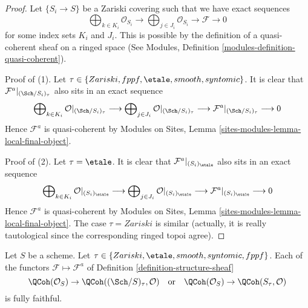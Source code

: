 \begin{proof}
Let $\{S_i \to S\}$ be a Zariski covering such that we have exact sequences
$$
\bigoplus\nolimits_{k \in K_i} \mathcal{O}_{S_i} \longrightarrow
\bigoplus\nolimits_{j \in J_i} \mathcal{O}_{S_i} \longrightarrow
\mathcal{F} \longrightarrow 0
$$
for some index sets $K_i$ and $J_i$. This is possible by the definition
of a quasi-coherent sheaf on a ringed space
(See Modules, Definition \ref{modules-definition-quasi-coherent}).

\medskip\noindent
Proof of (1). Let $\tau \in \{Zariski, \linebreak[0] fppf, \linebreak[0]
\etale, \linebreak[0] smooth, \linebreak[0] syntomic\}$.
It is clear that $\mathcal{F}^a|_{(\Sch/S_i)_\tau}$ also
sits in an exact sequence
$$
\bigoplus\nolimits_{k \in K_i} \mathcal{O}|_{(\Sch/S_i)_\tau}
\longrightarrow
\bigoplus\nolimits_{j \in J_i} \mathcal{O}|_{(\Sch/S_i)_\tau}
\longrightarrow
\mathcal{F}^a|_{(\Sch/S_i)_\tau} \longrightarrow 0
$$
Hence $\mathcal{F}^a$ is quasi-coherent by Modules on Sites,
Lemma \ref{sites-modules-lemma-local-final-object}.

\medskip\noindent
Proof of (2). Let $\tau = \etale$.
It is clear that $\mathcal{F}^a|_{(S_i)_\etale}$ also sits
in an exact sequence
$$
\bigoplus\nolimits_{k \in K_i} \mathcal{O}|_{(S_i)_\etale}
\longrightarrow
\bigoplus\nolimits_{j \in J_i} \mathcal{O}|_{(S_i)_\etale}
\longrightarrow
\mathcal{F}^a|_{(S_i)_\etale} \longrightarrow 0
$$
Hence $\mathcal{F}^a$ is quasi-coherent by Modules on Sites,
Lemma \ref{sites-modules-lemma-local-final-object}.
The case $\tau = Zariski$ is similar (actually, it is really
tautological since the corresponding ringed topoi agree).
\end{proof}

\begin{lemma}
\label{lemma-fully-faithful-associated}
Let $S$ be a scheme.
Let $\tau \in \{Zariski, \linebreak[0] \etale, \linebreak[0]
smooth, \linebreak[0] syntomic, \linebreak[0] fppf\}$.
Each of the functors $\mathcal{F} \mapsto \mathcal{F}^a$
of Definition \ref{definition-structure-sheaf}
$$
\QCoh(\mathcal{O}_S) \to \QCoh((\Sch/S)_\tau, \mathcal{O})
\quad\text{or}\quad
\QCoh(\mathcal{O}_S) \to \QCoh(S_\tau, \mathcal{O})
$$
is fully faithful.
\end{lemma}

